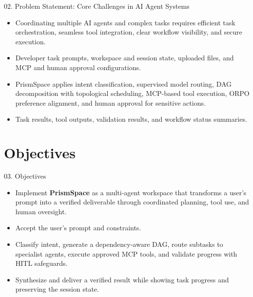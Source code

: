 \documentclass[aspectratio=169,10pt]{beamer}
\begin{document}
\begin{frame}[t]{02. Problem Statement: Core Challenges in AI Agent Systems}
\vfill
\begin{center}
\begin{minipage}{0.88\linewidth}
\large
\begin{itemize}
  \setlength{\itemsep}{12pt}
  \setlength{\leftmargin}{1.5em}
  \item Coordinating multiple AI agents and complex tasks requires efficient task orchestration, seamless tool integration, clear workflow visibility, and secure execution.
  \item Developer task prompts, workspace and session state, uploaded files, and MCP and human approval configurations.
  \item PrismSpace applies intent classification, supervised model routing, DAG decomposition with topological scheduling, MCP-based tool execution, ORPO preference alignment, and human approval for sensitive actions.
  \item Task results, tool outputs, validation results, and workflow status summaries.
\end{itemize}
\end{minipage}
\end{center}
\vfill
\end{frame}

\section{Objectives}

\begin{frame}[t]{03. Objectives}
\vfill
\begin{center}
\begin{minipage}{0.88\linewidth}
\large
\begin{itemize}
  \setlength{\itemsep}{12pt}
  \setlength{\leftmargin}{1.5em}
  \item Implement \textbf{PrismSpace} as a multi-agent workspace that transforms a user's prompt into a verified deliverable through coordinated planning, tool use, and human oversight.
  \item Accept the user's prompt and constraints.
  \item Classify intent, generate a dependency-aware DAG, route subtasks to specialist agents, execute approved MCP tools, and validate progress with HITL safeguards.
  \item Synthesize and deliver a verified result while showing task progress and preserving the session state.
\end{itemize}
\end{minipage}
\end{center}
\vfill
\end{frame}
\end{document}
